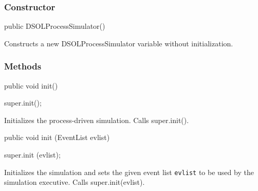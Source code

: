 \subsubsection* {Constructor}
\begin{code}

   public DSOLProcessSimulator() \begin{hide} {
   }\end{hide}
\end{code}
 \begin{tabb}  Constructs a new DSOLProcessSimulator variable without initialization.
 \end{tabb}

\subsubsection* {Methods}
\begin{code}

   public void init()\begin{hide} {
      super.init();
   }\end{hide}
\end{code}
\begin{tabb}   Initializes the process-driven simulation. Calls super.init().
\end{tabb}
\begin{code}

   public void init (EventList evlist)\begin{hide} {
      super.init (evlist);
   }\end{hide}
\end{code}
\begin{tabb}  Initializes the simulation and sets the given event list \texttt{evlist}
  to be used by the simulation executive. Calls super.init(evlist).
\end{tabb}
\begin{htmlonly}
\end{htmlonly}
